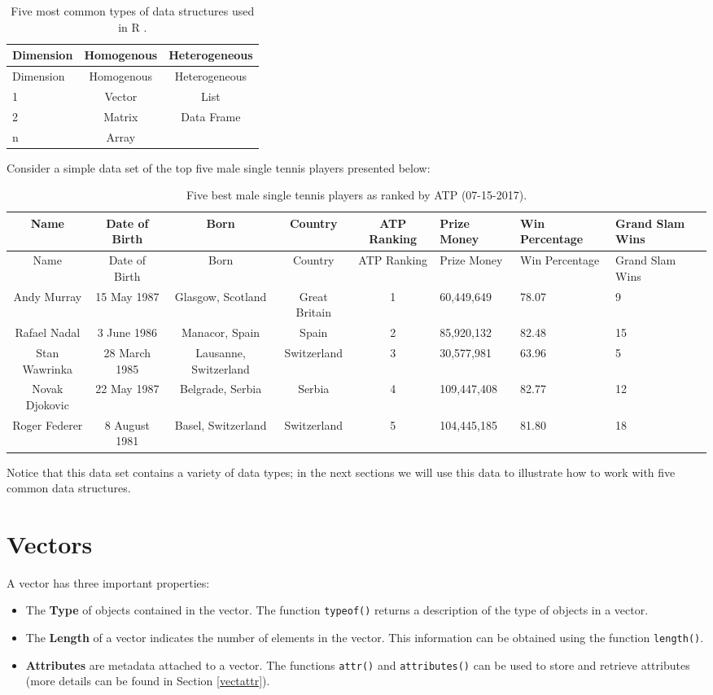 \documentclass[12pt,]{krantz}
\providecommand{\tightlist}{%
  \setlength{\itemsep}{0pt}\setlength{\parskip}{0pt}}
\let\BeginKnitrBlock\begin \let\EndKnitrBlock\end
\begin{document}
\begin{longtable}[]{@{}lcc@{}}
\caption{\label{tab:ds} Five most common types of data structures used in R
\citep{wickham2014advanced}.}\tabularnewline
\toprule
Dimension & Homogenous & Heterogeneous\tabularnewline
\midrule
\endfirsthead
\toprule
Dimension & Homogenous & Heterogeneous\tabularnewline
\midrule
\endhead
1 & Vector & List\tabularnewline
2 & Matrix & Data Frame\tabularnewline
n & Array &\tabularnewline
\bottomrule
\end{longtable}

Consider a simple data set of the top five male single tennis players
presented below:

\begin{longtable}[]{@{}ccccclll@{}}
\caption{\label{tab:tennis} Five best male single tennis players as ranked
by ATP (07-15-2017).}\tabularnewline
\toprule
Name & Date of Birth & Born & Country & ATP Ranking & Prize Money & Win
Percentage & Grand Slam Wins\tabularnewline
\midrule
\endfirsthead
\toprule
Name & Date of Birth & Born & Country & ATP Ranking & Prize Money & Win
Percentage & Grand Slam Wins\tabularnewline
\midrule
\endhead
Andy Murray & 15 May 1987 & Glasgow, Scotland & Great Britain & 1 &
60,449,649 & 78.07 & 9\tabularnewline
Rafael Nadal & 3 June 1986 & Manacor, Spain & Spain & 2 & 85,920,132 &
82.48 & 15\tabularnewline
Stan Wawrinka & 28 March 1985 & Lausanne, Switzerland & Switzerland & 3
& 30,577,981 & 63.96 & 5\tabularnewline
Novak Djokovic & 22 May 1987 & Belgrade, Serbia & Serbia & 4 &
109,447,408 & 82.77 & 12\tabularnewline
Roger Federer & 8 August 1981 & Basel, Switzerland & Switzerland & 5 &
104,445,185 & 81.80 & 18\tabularnewline
\bottomrule
\end{longtable}

Notice that this data set contains a variety of data types; in the next
sections we will use this data to illustrate how to work with five
common data structures.

\section{Vectors}\label{vectors}

A vector has three important properties:

\BeginKnitrBlock{rmdimportant}
\begin{itemize}
\tightlist
\item
  The \textbf{Type} of objects contained in the vector. The function
  \texttt{typeof()} returns a description of the type of objects in a
  vector.
\item
  The \textbf{Length} of a vector indicates the number of elements in
  the vector. This information can be obtained using the function
  \texttt{length()}.
\item
  \textbf{Attributes} are metadata attached to a vector. The functions
  \texttt{attr()} and \texttt{attributes()} can be used to store and
  retrieve attributes (more details can be found in Section
  \ref{vectattr}).\\
\end{itemize}
\EndKnitrBlock{rmdimportant}
\end{document}
